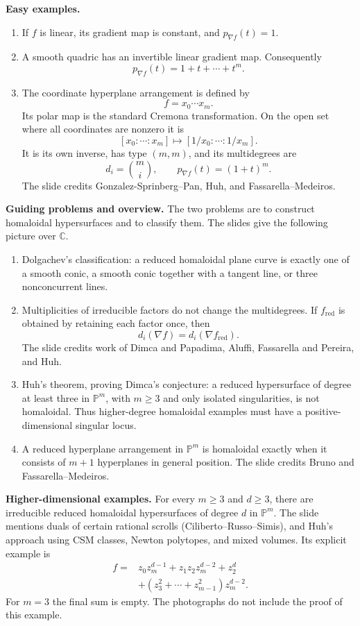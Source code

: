 \medskip\noindent
\textbf{Easy examples.}
\begin{enumerate}
\item If $f$ is linear, its gradient map
is constant, and $p_{\nabla f}(t)=1$.
\item A smooth quadric has an invertible
linear gradient map. Consequently
$$
p_{\nabla f}(t)=1+t+\cdots+t^m.
$$
\item The coordinate hyperplane
arrangement is defined by
$$
f=x_0\cdots x_m.
$$
Its polar map is the standard Cremona
transformation. On the open set where
all coordinates are nonzero it is
$$
[x_0:\cdots:x_m]\longmapsto
[1/x_0:\cdots:1/x_m].
$$
It is its own inverse, has type $(m,m)$,
and its multidegrees are
$$
d_i=\binom{m}{i},
\qquad p_{\nabla f}(t)=(1+t)^m.
$$
The slide credits Gonzalez-Sprinberg--Pan,
Huh, and Fassarella--Medeiros.
\end{enumerate}

\medskip\noindent
\textbf{Guiding problems and overview.}
The two problems are to construct
homaloidal hypersurfaces and to classify
them. The slides give the following
picture over $\mathbb{C}$.
\begin{enumerate}
\item Dolgachev's classification:
a reduced homaloidal plane curve is
exactly one of a smooth conic, a smooth
conic together with a tangent line, or
three nonconcurrent lines.
\item Multiplicities of irreducible
factors do not change the multidegrees.
If $f_{\mathrm{red}}$ is obtained by
retaining each factor once, then
$$
d_i(\nabla f)=
d_i(\nabla f_{\mathrm{red}}).
$$
The slide credits work of Dimca and
Papadima, Aluffi, Fassarella and Pereira,
and Huh.
\item Huh's theorem, proving Dimca's
conjecture: a reduced hypersurface of
degree at least three in
$\mathbb{P}^m$, with $m\geq3$ and only
isolated singularities, is not homaloidal.
Thus higher-degree homaloidal examples
must have a positive-dimensional singular
locus.
\item A reduced hyperplane arrangement
in $\mathbb{P}^m$ is homaloidal exactly
when it consists of $m+1$ hyperplanes in
general position. The slide credits
Bruno and Fassarella--Medeiros.
\end{enumerate}

\medskip\noindent
\textbf{Higher-dimensional examples.}
For every $m\geq3$ and $d\geq3$, there
are irreducible reduced homaloidal
hypersurfaces of degree $d$ in
$\mathbb{P}^m$.
The slide mentions duals of certain
rational scrolls
(Ciliberto--Russo--Simis), and Huh's
approach using CSM classes, Newton
polytopes, and mixed volumes.
Its explicit example is
$$
\begin{aligned}
f={}&z_0z_m^{d-1}+z_1z_2z_m^{d-2}
+z_2^d\\
&+(z_3^2+\cdots+z_{m-1}^2)z_m^{d-2}.
\end{aligned}
$$
For $m=3$ the final sum is empty.
The photographs do not include the proof
of this example.

